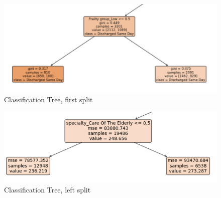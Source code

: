 \documentclass[../thesis.tex]{subfiles}
\begin{document}
\begin{landscape}
\begin{figure}
    \centering
    \includegraphics[scale =0.8]{Chapter4/Figures/Split1.png}
    \caption{Classification Tree, first split}
    \label{fig:Class1}
\end{figure}

\begin{figure}
    \centering
    \includegraphics[scale =0.8]{Chapter4/Figures/Split2.png}
    \caption{Classification Tree, left split}
    \label{fig:Class2}
\end{figure}


\end{landscape}
\end{document}
